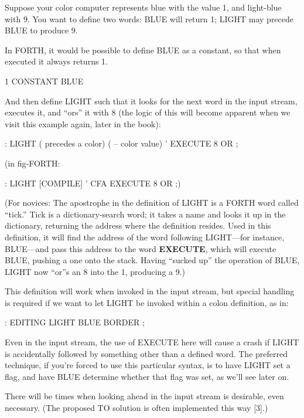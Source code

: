 Suppose your color computer represents blue with the value 1, and
light-blue with 9. You want to define two words: BLUE will return 1;
LIGHT may precede BLUE to produce 9.

In FORTH, it would be possible to define BLUE as a constant, so
that when executed it always returns 1.

\begin{Code}
1 CONSTANT BLUE
\end{Code}

And then define LIGHT such that it looks for the next word in the input
stream, executes it, and ``ors'' it with 8 (the logic of this will become
apparent when we visit this example again, later in the book):
\begin{Code}
: LIGHT  ( precedes a color)  ( -- color value)
     ' EXECUTE  8 OR ;
\end{Code}
(in fig-FORTH:
\begin{Code}
: LIGHT [COMPILE] '  CFA EXECUTE  8 OR ;)
\end{Code}
(For novices: The apostrophe in the definition of LIGHT is a FORTH
word called ``tick.'' Tick is a dictionary-search word; it takes a name and
looks it up in the dictionary, returning the address where the definition
resides. Used in this definition, it will find the address of the word
following LIGHT---for instance, BLUE---and pass this address to the word
\textbf{EXECUTE}, which will execute BLUE, pushing a one onto the stack.
Having ``sucked up'' the operation of BLUE, LIGHT now ``or''s an 8 into
the 1, producing a 9.)

This definition will work when invoked in the input stream, but special
handling is required if we want to let LIGHT be invoked within a
colon definition, as in:
\begin{Code}
: EDITING   LIGHT BLUE BORDER ;
\end{Code}
Even in the input stream, the use of EXECUTE here will cause
a crash if LIGHT is accidentally followed by something other than a
defined word.  The preferred technique, if you're forced to use this
particular syntax, is to have LIGHT set a flag, and have BLUE
determine whether that flag was set, as we'll see later on.

There will be times when looking ahead in the input stream is desirable,
even necessary. (The proposed TO solution is often implemented
this way [3].)

